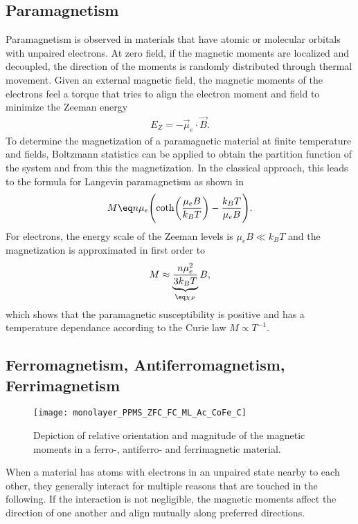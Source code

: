 \documentclass[\main/dresen_thesis.tex]{subfiles}
\begin{document}
  \subsection{Paramagnetism}\label{ch:theoreticalBackground:magnetism:paramagnetism}
    Paramagnetism is observed in materials that have atomic or molecular orbitals with unpaired electrons.
    At zero field, if the magnetic moments are localized and decoupled, the direction of the moments is randomly distributed through thermal movement.
    Given an external magnetic field, the magnetic moments of the electrons feel a torque that tries to align the electron moment and field to minimize the Zeeman energy
    \begin{align}
      E_Z = - \vec{\mu}_e \cdot \vec{B}.
    \end{align}
    To determine the magnetization of a paramagnetic material at finite temperature and fields, Boltzmann statistics can be applied to obtain the partition function of the system and from this the magnetization.
    In the classical approach, this leads to the formula for Langevin paramagnetism as shown in 
    \begin{align}
      M \eq n \mu_e \Biggl( \coth \biggl(\frac{\mu_e B}{k_B T} \biggr) - \frac{k_B T}{\mu_e B} \Biggr).
    \end{align}
    For electrons, the energy scale of the Zeeman levels is $\mu_e B \ll k_B T$ and the magnetization is approximated in first order to
    \begin{align}
      M \approx \underbrace{\frac{n \mu_e^2}{3k_B T}}_{\eq \chi_P} B,
    \end{align}
    which shows that the paramagnetic susceptibility is positive and has a temperature dependance according to the Curie law $M \propto T^{-1}$.

  \subsection{Ferromagnetism, Antiferromagnetism, Ferrimagnetism}
    \begin{figure}[tb]
      \centering
      \texttt{[image: monolayer\_PPMS\_ZFC\_FC\_ML\_Ac\_CoFe\_C]}
      \caption{\label{fig:theoreticalBackground:magnetism:fm_afm_fim}Depiction of relative orientation and magnitude of the magnetic moments in a ferro-, antiferro- and ferrimagnetic material.}
    \end{figure}

    When a material has atoms with electrons in an unpaired state nearby to each other, they generally interact for multiple reasons that are touched in the following.
    If the interaction is not negligible, the magnetic moments affect the direction of one another and align mutually along preferred directions.
\end{document}
